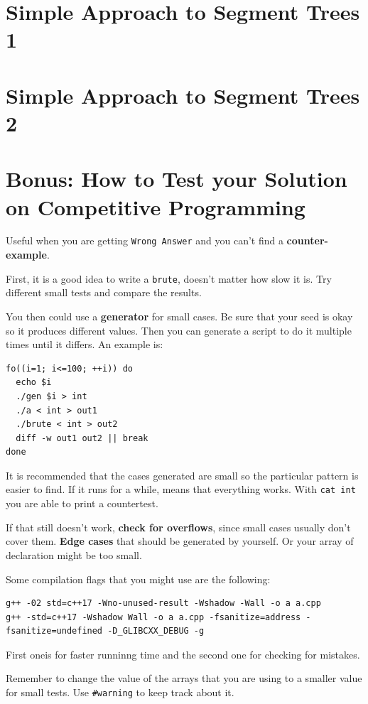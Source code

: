 \documentclass{IEEEtran}
\begin{document}
  \section{Simple Approach to Segment Trees 1}
  \section{Simple Approach to Segment Trees 2}
  \section{Bonus: How to Test your Solution on Competitive Programming}
    Useful when you are getting \texttt{Wrong Answer} and you can't find a \textbf{counter-example}.\par 
    First, it is a good idea to write a \texttt{brute}, doesn't matter how slow it is. Try different small tests and compare the results.\par 
    You then could use a \textbf{generator} for small cases. Be sure that your seed is okay so it produces different values. Then you can generate a script to do it multiple times until it differs. An example is:
    \begin{lstlisting}
fo((i=1; i<=100; ++i)) do
  echo $i
  ./gen $i > int
  ./a < int > out1
  ./brute < int > out2
  diff -w out1 out2 || break
done
    \end{lstlisting}
    \par It is recommended that the cases generated are small so the particular pattern is easier to find. If it runs for a while, means that everything works. With \texttt{cat int} you are able to print a countertest.\par 
    If that still doesn't work, \textbf{check for overflows}, since small cases usually don't cover them. \textbf{Edge cases} that should be generated by yourself. Or your array of declaration might be too small. \par
    Some compilation flags that you might use are the following:
    \begin{lstlisting}
g++ -02 std=c++17 -Wno-unused-result -Wshadow -Wall -o a a.cpp
g++ -std=c++17 -Wshadow Wall -o a a.cpp -fsanitize=address -fsanitize=undefined -D_GLIBCXX_DEBUG -g
    \end{lstlisting}
    First oneis for faster runninng time and the second one for checking for mistakes.\par 
    Remember to change the value of the arrays that you are using to a smaller value for small tests. Use \texttt{\#warning} to keep track about it.\par
\end{document}
